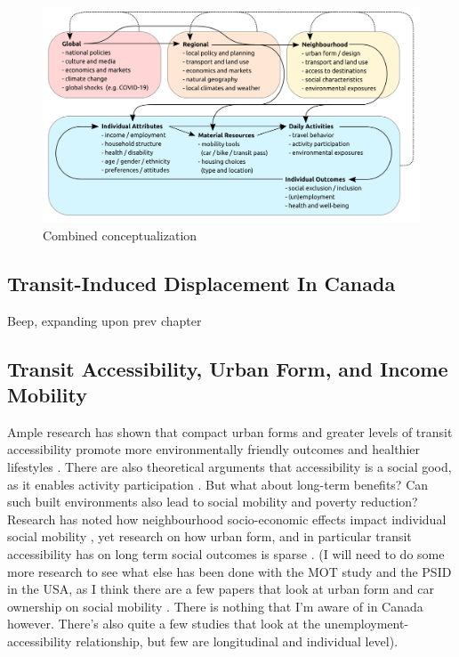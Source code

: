 \begin{figure}[H]
	\caption{Combined conceptualization}
	\includegraphics[width=7in]{figures/my_idea.png}
	\centering
\end{figure}




\subsection{Transit-Induced Displacement In Canada}

Beep, expanding upon prev chapter




\subsection{Transit Accessibility, Urban Form, and Income Mobility}

Ample research has shown that compact urban forms and greater levels of transit accessibility promote more environmentally friendly outcomes and healthier lifestyles \cite{ewing_compactness_2015,ewing_travel_2010,cervero_travel_1997}. There are also theoretical arguments that accessibility is a social good, as it enables activity participation \cite{martens_transport_2016,pereira_distributive_2017}.
But what about long-term benefits? Can such built environments also lead to social mobility and poverty reduction? Research has noted how neighbourhood socio-economic effects impact individual social mobility \cite{chetty_effects_2016}, yet research on how urban form, and in particular transit accessibility has on long term social outcomes is sparse \cite{ewing_does_2016,fransen_relationship_2019}.
(I will need to do some more research to see what else has been done with the MOT study and the PSID in the USA, as I think there are a few papers that look at urban form and car ownership on social mobility \cite{smart_disentangling_2020}. There is nothing that I'm aware of in Canada however. There's also quite a few studies that look at the unemployment-accessibility relationship, but few are longitudinal and individual level).

